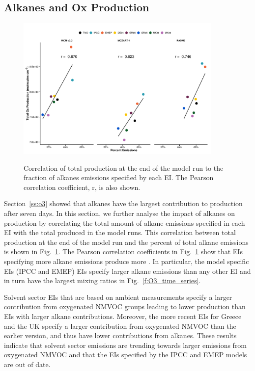 \documentclass[14pt]{extarticle}
\begin{document}
\subsection{Alkanes and Ox Production}
\begin{figure}
    \centering
    \caption{Correlation of total  production at the end of the model run to the fraction of alkanes emissions specified by each EI. The Pearson correlation coefficient, r, is also shown.}
    \includegraphics[width=0.9\textwidth]{Scientific_Writing_Course/Pictures/Ox_production_vs_type_emission_fraction_all_mechanisms}
    \label{f:correlations}
    \vspace{-2mm}
\end{figure} 
Section~\ref{ss:o3} showed that alkanes have the largest contribution to  production after seven days.
In this section, we further analyse the impact of alkanes on  production by correlating the total amount of alkane emissions specified in each EI with the total  produced in the model runs.  
This correlation between total  production at the end of the model run and the percent of total alkane emissions is shown in Fig.~\ref{f:correlations}.
The Pearson correlation coefficients in Fig.~\ref{f:correlations} show that EIs specifying more alkane emissions produce more .
In particular, the model specific EIs (IPCC and EMEP) EIs specify larger alkane emissions than any other EI and in turn have the largest  mixing ratios in Fig.~\ref{f:O3_time_series}.

Solvent sector EIs that are based on ambient measurements specify a larger contribution from oxygenated NMVOC groups leading to lower  production than EIs with larger alkane contributions.
Moreover, the more recent EIs for Greece and the UK specify a larger contribution from oxygenated NMVOC than the earlier version, and thus have lower contributions from alkanes.
These results indicate that solvent sector emissions are trending towards larger emissions from oxygenated NMVOC and that the EIs specified by the IPCC and EMEP models are out of date.
\end{document}
